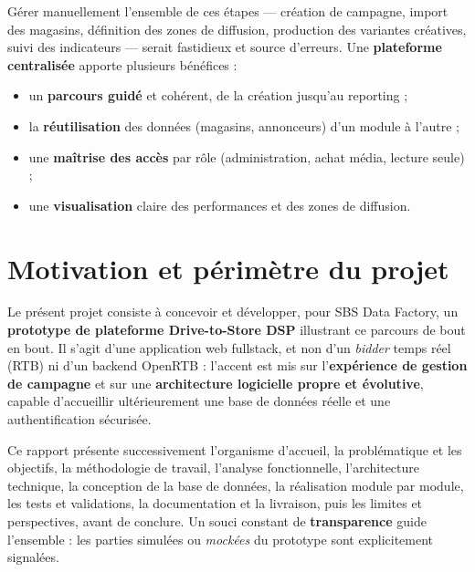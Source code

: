 Gérer manuellement l'ensemble de ces étapes --- création de campagne, import
des magasins, définition des zones de diffusion, production des variantes
créatives, suivi des indicateurs --- serait fastidieux et source d'erreurs.
Une \textbf{plateforme centralisée} apporte plusieurs bénéfices :

\begin{itemize}
  \item un \textbf{parcours guidé} et cohérent, de la création jusqu'au
        reporting ;
  \item la \textbf{réutilisation} des données (magasins, annonceurs) d'un
        module à l'autre ;
  \item une \textbf{maîtrise des accès} par rôle (administration, achat média,
        lecture seule) ;
  \item une \textbf{visualisation} claire des performances et des zones de
        diffusion.
\end{itemize}

\section{Motivation et périmètre du projet}

Le présent projet consiste à concevoir et développer, pour SBS Data Factory,
un \textbf{prototype de plateforme Drive-to-Store DSP} illustrant ce parcours
de bout en bout. Il s'agit d'une application web fullstack, et non d'un
\emph{bidder} temps réel (RTB) ni d'un backend OpenRTB : l'accent est mis sur
l'\textbf{expérience de gestion de campagne} et sur une \textbf{architecture
logicielle propre et évolutive}, capable d'accueillir ultérieurement une base
de données réelle et une authentification sécurisée.

Ce rapport présente successivement l'organisme d'accueil, la problématique et
les objectifs, la méthodologie de travail, l'analyse fonctionnelle,
l'architecture technique, la conception de la base de données, la réalisation
module par module, les tests et validations, la documentation et la livraison,
puis les limites et perspectives, avant de conclure. Un souci constant de
\textbf{transparence} guide l'ensemble : les parties simulées ou \emph{mockées}
du prototype sont explicitement signalées.
